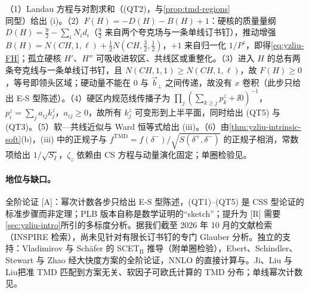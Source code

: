 \begin{proofsketch}
（1）Landau 方程\cite[附录~C]{Liu:2022nnk}与对割求和（(QT2)，与\cref{prop:tmd-regions}同型）给出 (i)。（2）$F(H)=-D(H)-B(H)+1$：硬核的质量量纲 $D(H)=\frac92-\sum_iN_id_i$（$\frac92$ 来自两个夸克场与一条单线订书钉），推动增强 $B(H)=N(CH,1,\ell)+\frac12N(CH,\frac32,\frac12)$，$+1$ 来自归一化 $1/P^z$，即得\cref{eq:yzliu-FH}；孤立硬核 $H'$、$H''$ 可吸收进软区、共线区或重整化\cite[式~(54)--(61)]{Liu:2022nnk}。（3）进入 $H$ 的总有两条夸克线与一条单线订书钉，且 $N(CH,1,1)\ge N(CH,1,\ell)$，故 $F(H)\ge0$，等号即领头区域；硬动量不能在 $0$ 与 $\vec b_\perp$ 之间传递，故没有 $x$ 卷积\cite[式~(64)--(68)]{Liu:2022nnk}（此步只给出 E-S 型陈述）。（4）硬区内规范线传播子为 $\prod_j(\sum_{k\ge j}p^z_k+\ii0)^{-1}$，$p^z_i=\sum_ja_{ij}k^z_j$，$a_{ij}\ge0$，故所有 $k^z_j$ 可变形到上半平面，同时给出 (QT5) 与 (QT3)\cite[式~(62)--(63)]{Liu:2022nnk}。（5）软—共线近似与 Ward 恒等式给出 (iii)。（6）由\cref{thm:yzliu-intrinsic-soft}(b)，(iii) 中的正规子与 $f^{\mathrm{TMD}}=f(\delta^-)/\sqrt{S(\delta^+,\delta^-)}$ 的正规子相消，常数项给出 $1/\sqrt{S_I}$，$\zeta_z$ 依赖由 CS 方程与动量演化固定；单圈检验见\cite[式~(23)、(39)、(85)]{Liu:2022nnk}。
\end{proofsketch}

\paragraph{地位与缺口。}全阶论证 [A]：幂次计数各步只给出 E-S 型陈述，(QT1)--(QT5) 是 CSS 型论证的标准步骤而非定理；PLB 版本自称是数学证明的“sketch”\cite{Ji:2019ewn}；提升为 [R] 需要\cref{sec:yzliu-intro}所引的多标度分析。据我们截至 2026 年 10 月的文献检索（INSPIRE 检索），尚未见针对有限长订书钉的专门 Glauber 分析。独立的支持：Vladimirov 与 Schäfer 的 SCET$_{\mathrm{II}}$ 推导（附单圈检验）\cite{Vladimirov:2020ofp}，Ebert、Schindler、Stewart 与 Zhao 经大快度方案的全阶论证\cite{Ebert:2022fmh}，NNLO 的直接计算\cite{delRio:2023pse}与\cite{Ji:2023pba}。Ji、Liu 与 Liu\cite{Ji:2019ewn}把准 TMD 匹配到方案无关、软因子可欧氏计算的 TMD 分布；单线幂次计数见\cite[式~(54)--(68)]{Liu:2022nnk}。

